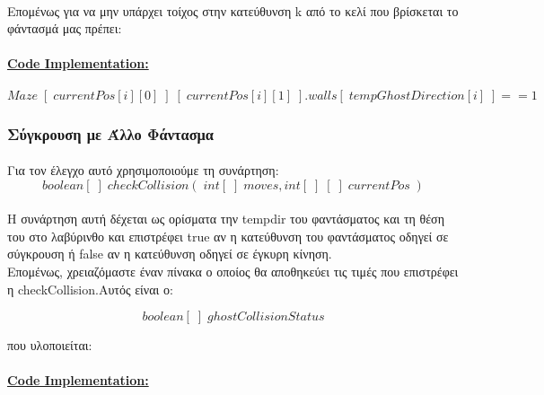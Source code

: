\documentclass[12pt,a4paper]{article}
\newcommand{\lt}{\latintext}
\newcommand{\gt}{\greektext}
\begin{document}
\paragraph*{}	Επομένως για να μην υπάρχει τοίχος στην κατεύθυνση \lt k  \gt από το κελί που βρίσκεται το φάντασμά μας πρέπει:
	
	\paragraph{\underline{\lt Code Implementation:}}
	
	\begin{equation*}
		Maze\; [\; currentPos[i][0]\;] \; [\;currentPos[i][1] \; ].walls[\;tempGhostDirection[i]\;] == 1
	\end{equation*}
	
	\subsubsection{Σύγκρουση με Άλλο Φάντασμα}
\paragraph*{}	Για τον έλεγχο αυτό χρησιμοποιούμε τη συνάρτηση:
	\begin{equation*}
	boolean[\;] \; checkCollision(\; int[\;] \; moves, int[\;]\;[\;]\;currentPos\;)
	\end{equation*}
	
\paragraph*{}	Η συνάρτηση αυτή δέχεται ως ορίσματα την {\lt tempdir} του φαντάσματος και τη θέση του στο λαβύρινθο και επιστρέφει \lt true \gt αν η κατεύθυνση του φαντάσματος οδηγεί σε σύγκρουση ή \lt false \gt αν η κατεύθυνση οδηγεί σε έγκυρη κίνηση. \\ Επομένως, χρειαζόμαστε έναν πίνακα ο οποίος θα αποθηκεύει τις τιμές που επιστρέφει η \lt checkCollision.\gt Αυτός είναι ο: 
	
	\begin{equation*}
	boolean[\;] \; ghostCollisionStatus
	\end{equation*}
	
	που υλοποιείται:
	 
	\paragraph{\underline{\lt Code Implementation:}}
	
\end{document}
